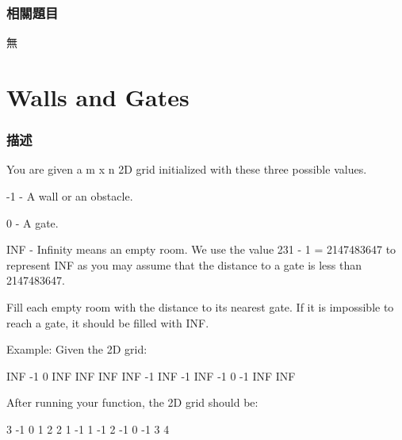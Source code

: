 \subsubsection{相關題目}

\begindot
\item 無
\myenddot

\section{Walls and Gates}
\label{sec:walls-and-gates}

\subsubsection{描述}
You are given a m x n 2D grid initialized with these three possible values.

\begindot
\item -1 - A wall or an obstacle.
\item 0 - A gate.
\item INF - Infinity means an empty room. We use the value 231 - 1 = 2147483647 to represent INF as you may assume that the distance to a gate is less than 2147483647.
\myenddot

Fill each empty room with the distance to its nearest gate. If it is impossible to reach a gate, it should be filled with INF.

Example:
Given the 2D grid:
\begin{Code}
INF  -1  0  INF
INF INF INF  -1
INF  -1 INF  -1
  0  -1 INF INF
\end{Code}

After running your function, the 2D grid should be:
\begin{Code}
  3  -1   0   1
  2   2   1  -1
  1  -1   2  -1
  0  -1   3   4
\end{Code}


